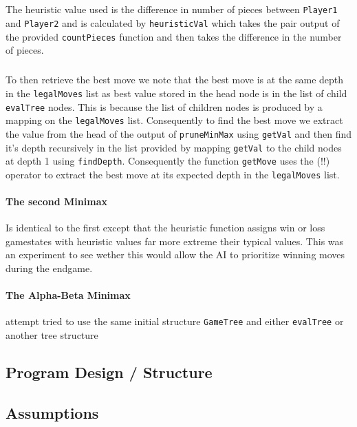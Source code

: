 \documentclass[11pt]{article}
\begin{document}
\subparagraph*{}The heuristic value used is the difference in number of pieces between \verb|Player1| and \verb|Player2| and is calculated by \verb|heuristicVal| which takes the pair output of the provided \verb|countPieces| function and then takes the difference in the number of pieces.

\subparagraph*{}To then retrieve the best move we note that the best move is at the same depth in the \verb|legalMoves| list as best value stored in the head node is in the list of child \verb|evalTree| nodes. This is because the list of children nodes is produced by a mapping on the \verb|legalMoves| list. Consequently to find the best move we extract the value from the head of the output of \verb|pruneMinMax| using \verb|getVal| and then find it's depth recursively in the list provided by mapping \verb|getVal| to the child nodes at depth 1 using \verb|findDepth|. Consequently the function \verb|getMove| uses the (!!) operator to extract the best move at its expected depth in the \verb|legalMoves| list.

\paragraph*{The second Minimax} Is identical to the first except that the heuristic function assigns win or loss gamestates with heuristic values far more extreme their typical values. This was an experiment to see wether this would allow the AI to prioritize winning moves during the endgame.

\paragraph{The Alpha-Beta Minimax} attempt tried to use the same initial structure \verb|GameTree| and either \verb|evalTree| or another tree structure


\newpage
\subsection{Program Design / Structure}


 \subsection{Assumptions}%


\end{document}
